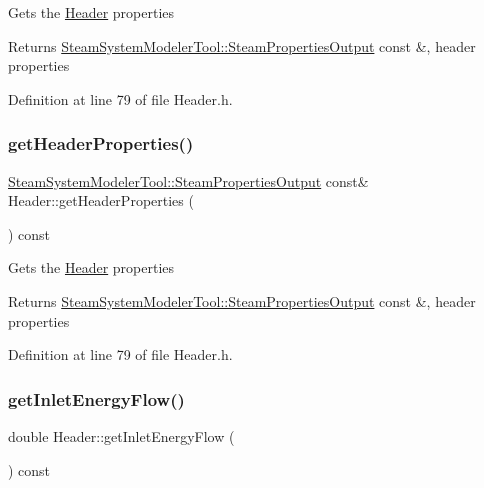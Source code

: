 Gets the \hyperlink{class_header}{Header} properties \begin{DoxyReturn}{Returns}
\hyperlink{struct_steam_system_modeler_tool_1_1_steam_properties_output}{Steam\+System\+Modeler\+Tool\+::\+Steam\+Properties\+Output} const \&, header properties 
\end{DoxyReturn}


Definition at line 79 of file Header.\+h.

\mbox{\label{class_header_a0d27b0e1b3c16cc24b4ba6f64abb7cb0}} 
\subsubsection{\texorpdfstring{get\+Header\+Properties()}{getHeaderProperties()}\hspace{0.1cm}{\footnotesize\ttfamily [3/3]}}
{\footnotesize\ttfamily \hyperlink{struct_steam_system_modeler_tool_1_1_steam_properties_output}{Steam\+System\+Modeler\+Tool\+::\+Steam\+Properties\+Output} const\& Header\+::get\+Header\+Properties (\begin{DoxyParamCaption}{ }\end{DoxyParamCaption}) const\hspace{0.3cm}{\ttfamily [inline]}}

Gets the \hyperlink{class_header}{Header} properties \begin{DoxyReturn}{Returns}
\hyperlink{struct_steam_system_modeler_tool_1_1_steam_properties_output}{Steam\+System\+Modeler\+Tool\+::\+Steam\+Properties\+Output} const \&, header properties 
\end{DoxyReturn}


Definition at line 79 of file Header.\+h.

\mbox{\label{class_header_a2a30ee96fa76bab1533cb9ceea0c8af3}} 
\subsubsection{\texorpdfstring{get\+Inlet\+Energy\+Flow()}{getInletEnergyFlow()}\hspace{0.1cm}{\footnotesize\ttfamily [1/3]}}
{\footnotesize\ttfamily double Header\+::get\+Inlet\+Energy\+Flow (\begin{DoxyParamCaption}{ }\end{DoxyParamCaption}) const\hspace{0.3cm}{\ttfamily [inline]}}

